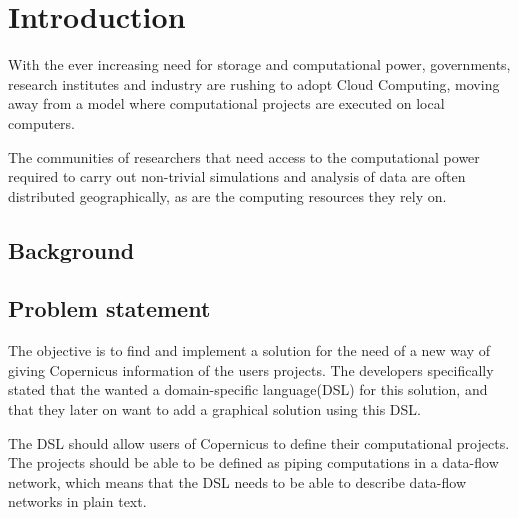 \chapter{Introduction}
With the ever increasing need for storage and computational power,
governments, research institutes and industry are rushing to adopt
Cloud Computing, moving away from a model where computational projects
are executed on local computers.

The communities of researchers that need access to the computational
power required to carry out non-trivial simulations and analysis of
data are often distributed geographically, as are the computing
resources they rely on.

\section{Background}




\section{Problem statement}
The objective is to find and implement a solution for the need of a
new way of giving Copernicus information of the users projects. The
developers specifically stated that the wanted a domain-specific
language(DSL) for this solution, and that they later on want to add a
graphical solution using this DSL.

The DSL should allow users of Copernicus to define their computational
projects. The projects should be able to be defined as piping
computations in a data-flow network, which means that the DSL needs to
be able to describe data-flow networks in plain text.

